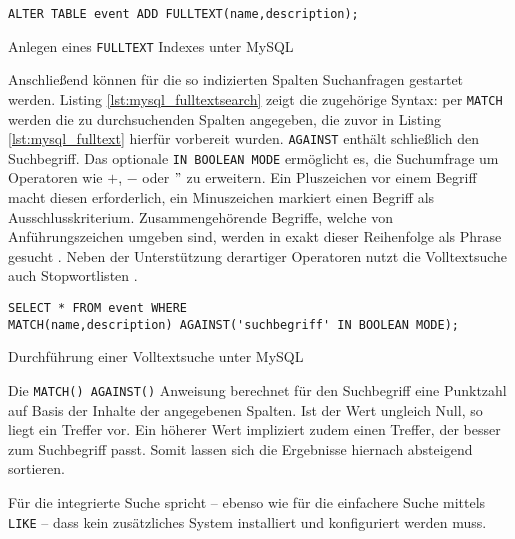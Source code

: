 \begin{listing}[ht!]
\begin{margincap}
\begin{verbatim}
ALTER TABLE event ADD FULLTEXT(name,description);
\end{verbatim}
\caption[FULLTEXT Index unter MySQL]{Anlegen eines \texttt{FULLTEXT} Indexes unter MySQL}
\label{lst:mysql_fulltext}
\end{margincap}
\end{listing}

Anschließend können für die so indizierten Spalten Suchanfragen gestartet werden. Listing \ref{lst:mysql_fulltextsearch} zeigt die zugehörige Syntax: per \texttt{MATCH} werden die zu durchsuchenden Spalten angegeben, die zuvor in Listing \ref{lst:mysql_fulltext} hierfür vorbereit wurden. \texttt{AGAINST} enthält schließlich den Suchbegriff. Das optionale \texttt{IN BOOLEAN MODE} ermöglicht es, die Suchumfrage um Operatoren wie $+$, $-$ oder $"$ zu erweitern. Ein Pluszeichen vor einem Begriff macht diesen erforderlich, ein Minuszeichen markiert einen Begriff als Ausschlusskriterium. Zusammengehörende Begriffe, welche von Anführungszeichen umgeben sind, werden in exakt dieser Reihenfolge als Phrase gesucht \cite[S. 197f]{Nixon.2014}. Neben der Unterstützung derartiger Operatoren nutzt die Volltextsuche auch Stopwortlisten \cite[S. 191]{Nixon.2014}.

\begin{listing}[ht!]
\begin{margincap}
\begin{verbatim}
SELECT * FROM event WHERE
MATCH(name,description) AGAINST('suchbegriff' IN BOOLEAN MODE);
\end{verbatim}
\caption[Volltextsuche unter MySQL]{Durchführung einer Volltextsuche unter MySQL}
\label{lst:mysql_fulltextsearch}
\end{margincap}
\end{listing}

Die \texttt{MATCH() AGAINST()} Anweisung berechnet für den Suchbegriff eine Punktzahl auf Basis der Inhalte der angegebenen Spalten. Ist der Wert ungleich Null, so liegt ein Treffer vor. Ein höherer Wert impliziert zudem einen Treffer, der besser zum Suchbegriff passt. Somit lassen sich die Ergebnisse hiernach absteigend sortieren.

Für die integrierte Suche spricht -- ebenso wie für die einfachere Suche mittels \texttt{LIKE} -- dass kein zusätzliches System installiert und konfiguriert werden muss.

